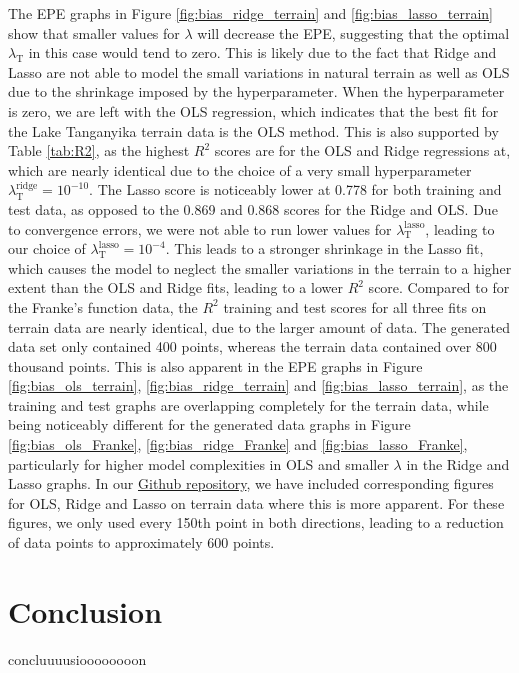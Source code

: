 \documentclass[a4paper, 10pt]{article}
\begin{document}
\begin{multicols}{2}
The EPE graphs in Figure \ref{fig:bias_ridge_terrain} and \ref{fig:bias_lasso_terrain} show that smaller values for $\lambda$ will decrease the EPE, suggesting that the optimal $\lambda_\text{T}$ in this case would tend to zero. This is likely due to the fact that Ridge and Lasso are not able to model the small variations in natural terrain as well as OLS due to the shrinkage imposed by the hyperparameter. When the hyperparameter is zero, we are left with the OLS regression, which indicates that the best fit for the Lake Tanganyika terrain data is the OLS method. This is also supported by Table \ref{tab:R2}, as the highest $R^2$ scores are for the OLS and Ridge regressions at, which are nearly identical due to the choice of a very small hyperparameter $\lambda_\text{T}^\text{ridge}=10^{-10}$. The Lasso score is noticeably lower at 0.778 for both training and test data, as opposed to the 0.869 and 0.868 scores for the Ridge and OLS. Due to convergence errors, we were not able to run lower values for $\lambda_\text{T} ^\text{lasso}$, leading to our choice of $\lambda_\text{T} ^\text{lasso}=10^{-4}$. This leads to a stronger shrinkage in the Lasso fit, which causes the model to neglect the smaller variations in the terrain to a higher extent than the OLS and Ridge fits, leading to a lower $R^2$ score. Compared to for the Franke's function data, the $R^2$ training and test scores for all three fits on terrain data are nearly identical, due to the larger amount of data. The generated data set only contained 400 points, whereas the terrain data contained over 800 thousand points.  This is also apparent in the EPE graphs in Figure \ref{fig:bias_ols_terrain}, \ref{fig:bias_ridge_terrain} and \ref{fig:bias_lasso_terrain}, as the training and test graphs are overlapping completely for the terrain data, while being noticeably different for the generated data graphs in Figure \ref{fig:bias_ols_Franke}, \ref{fig:bias_ridge_Franke} and \ref{fig:bias_lasso_Franke}, particularly for higher model complexities in OLS  and smaller $\lambda$ in the Ridge and Lasso graphs.  In our \href{https://github.com/bernharl/FYS-STK4155-project1}{Github repository}, we have included corresponding figures for OLS, Ridge and Lasso on terrain data where this is more apparent. For these figures, we only used every 150th point in both directions, leading to a reduction of data points to approximately 600 points. 



\section{Conclusion}
concluuuusioooooooon





\end{multicols}
\end{document}
